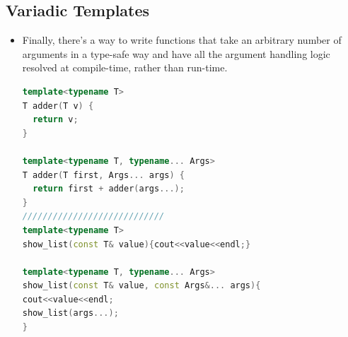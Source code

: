 \documentclass[a4paper,12pt,twoside]{book}
\begin{document}
\subsection{Variadic Templates}
\begin{itemize}
\item Finally, there's a way to write functions that take an arbitrary number of arguments in a type-safe way and have all the argument handling logic resolved at compile-time, rather than run-time.

\begin{lstlisting}[frame=single, language=c++]
template<typename T>
T adder(T v) {
  return v;
}

template<typename T, typename... Args>
T adder(T first, Args... args) {
  return first + adder(args...);
}
////////////////////////////
template<typename T>
show_list(const T& value){cout<<value<<endl;}

template<typename T, typename... Args>
show_list(const T& value, const Args&... args){
cout<<value<<endl;
show_list(args...);
}
\end{lstlisting}


\end{itemize}


\ifx \allfiles \undefined
\end{document}
